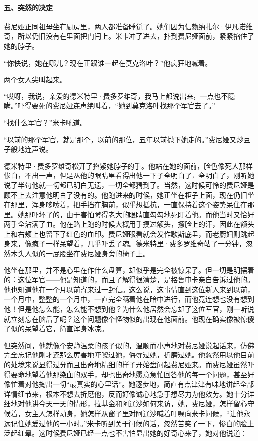 \paragraph*{五、突然的决定}
\par 费尼娅正同祖母坐在厨房里，两人都准备睡觉了。她们因为信赖纳扎尔·伊凡诺维奇，所以仍旧没有在里面把门闩上。米卡冲了进去，扑到费尼娅面前，紧紧掐住了她的脖子。
\par “你快说，她在哪儿？现在正跟谁一起在莫克洛叶？”他疯狂地喊着。
\par 两个女人尖叫起来。
\par “哎呀，我说，亲爱的德米特里·费多罗维奇，我马上都说出来，一点也不隐瞒。”吓得要死的费尼娅连声绝叫着，“她到莫克洛叶找那个军官去了。”
\par “找什么军官？”米卡吼道。
\par “以前的那个军官，就是那个，以前的那位，五年以前抛下她走的。”费尼娅又炒豆子般地连声说。
\par 德米特里·费多罗维奇松开了掐紧她脖子的手。他站在她的面前，脸色像死人那样惨白，不出一声，但是从他的眼睛里看得出他一下子全明白了，全明白了，刚听她说了半句他就一切都已明白无遗，一切全都猜到了。当然，这时候可怜的费尼娅是顾不上去注意他明白了没有的。他跑进来的时候，她正坐在柜子上面，现在仍旧坐在那里，浑身哆嗦着，把手挡在胸前，似乎想抵抗，一直保持着这个姿势呆住在那里。她那吓坏了的，由于害怕瞪得老大的眼睛直勾勾地死盯着他。而他当时又恰好两手全沾满了血。他在路上跑的时候大概用手摸过额头，擦脸上的汗，因此在额头上和右颊上也留下了红色的血印。费尼娅眼看就会发作歇斯底里，而老厨妇则跳起身来，像疯子一样呆望着，几乎吓丢了魂。德米特里·费多罗维奇站了一分钟，忽然木头人似的一屁股坐在费尼娅身旁的椅子上。
\par 他坐在那里，并不是心里在作什么盘算，却似乎是完全被惊呆了。但一切是明摆着的：这位军官——他是知道的，而且了解得很清楚，是格鲁申卡亲自告诉过他的。他也知道他在一个月以前寄来过一封信。这么说，这事情直到这位新人来到以前，一个月中，整整的一个月中，一直完全瞒着他在暗中进行，而他竟连想也没有想到他！但是他怎么能，怎么能不想到他？为什么他居然会忘却了这位军官，刚一听说就立刻忘在脑后了呢？这个问题像个怪物似的出现在他面前。他现在确实像被惊傻了似的呆望着它，简直浑身冰凉。
\par 但突然间，他就像个安静温柔的孩子似的，温顺而小声地对费尼娅说起话来，仿佛完全忘记他刚才还那么厉害地吓唬过她，侮辱过她，折磨过她。他忽然用以他目前的处境来说显得过分而且出奇地精细的样子开始盘问起费尼娅来。而费尼娅虽然吓得要命地望着他那染血的双手，却也出奇地愿意急忙回答他的每一个问题，甚至好像忙着对他掏出一切“最真实的心里话”。她逐步地，简直有点津津有味地讲起全部详情细节来，根本不想去折磨他，反而好像诚心地急于想尽力为他效劳。她十分详细地对他讲今天一天的情形，拉基金和阿辽沙如何来访，她，费尼娅，怎样留心守候着，女主人怎样动身，她怎样从窗子里对阿辽沙喊着叮嘱向米卡问候，“让他永远记住她爱过他的一小时。”米卡听到关于问候的话，忽然苦笑了一下，惨白的脸上泛起红晕。这时候费尼娅已经一点也不害怕显出她的好奇心来了，她对他说道：
